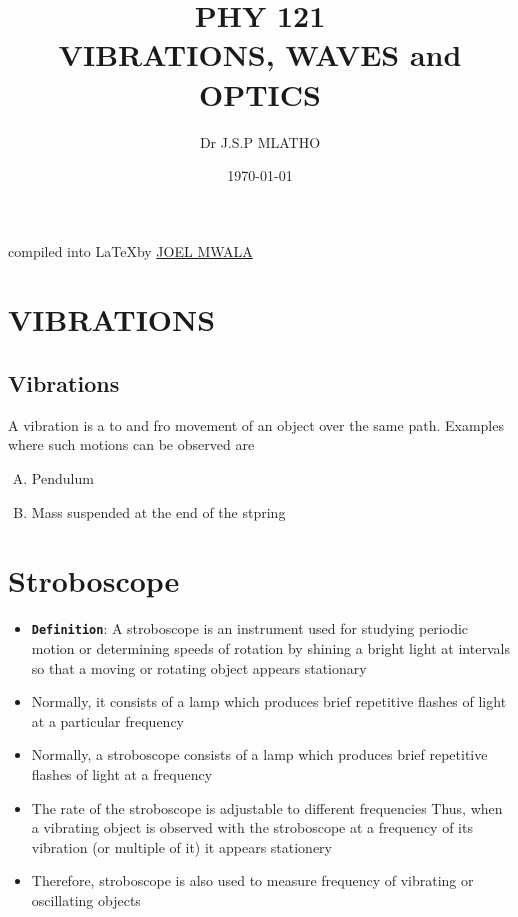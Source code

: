\documentclass{article}
\title{\textbf{PHY 121 \\[1in] VIBRATIONS, WAVES and OPTICS} }
\date{\today}
\author{Dr J.S.P MLATHO}
\begin{document}
\maketitle
\vspace{4in}
\begin{center}
    compiled into \LaTeX by \href{https://www.joelmwala.tech}{JOEL MWALA}
\end{center}
\newpage

\doublespacing
\tableofcontents
\singlespacing

\newpage


\section{VIBRATIONS}
\subsection{Vibrations}
A vibration is a to and fro movement of an object over the same path. Examples where such motions can be observed are

\begin{enumerate}[(A)]
    \item Pendulum
    \item Mass suspended at the end of the stpring
\end{enumerate}


\newpage






\section{Stroboscope}

\begin{itemize}
    \item \textbf{\texttt{Definition}}: A stroboscope is an instrument used for studying periodic
          motion or determining speeds of rotation by shining a bright light at
          intervals so that a moving or rotating object appears stationary
    \item Normally, it consists of a lamp which produces brief repetitive flashes of light at a particular frequency
    \item Normally, a stroboscope consists of a lamp which produces brief
          repetitive flashes of light at a frequency
    \item The rate of the stroboscope is adjustable to different frequencies
          Thus, when a vibrating object is observed with the stroboscope at a
          frequency of its vibration (or multiple of it) it appears stationery
    \item Therefore, stroboscope is also used to measure frequency of
          vibrating or oscillating objects
\end{itemize}
\end{document}
